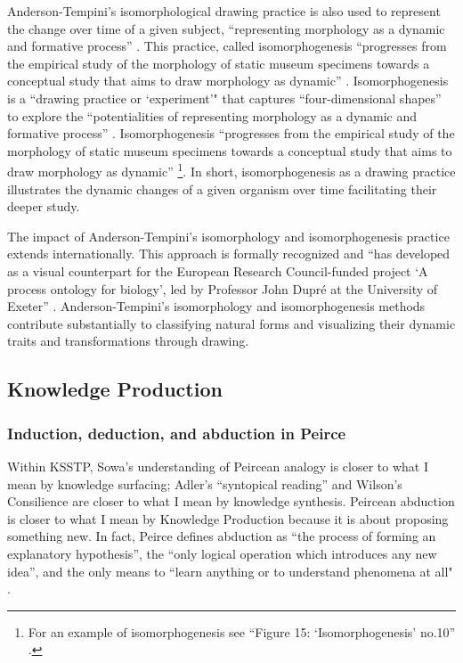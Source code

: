 Anderson-Tempini’s isomorphological drawing practice is also used to represent the change over time of a given subject, ``representing morphology as a dynamic and formative process” \citep[p. 179]{anderson_drawing_2018}. This practice, called isomorphogenesis ``progresses from the empirical study of the morphology of static museum specimens towards a conceptual study that aims to draw morphology as dynamic” \citep[p. 179]{anderson_drawing_2018}. Isomorphogenesis is a ``drawing practice or `experiment'" \citep[p. 179]{anderson_drawing_2018} that captures ``four-dimensional shapes” \citep[back cover]{anderson_drawing_2018} to explore the ``potentialities of representing morphology as a dynamic and formative process”  \citep[p. 179]{anderson_drawing_2018}. Isomorphogenesis ``progresses from the empirical study of the morphology of static museum specimens towards a conceptual study that aims to draw morphology as dynamic” \citep[p. 179]{anderson_drawing_2018} \footnote{For an example of isomorphogenesis see ``Figure 15: `Isomorphogenesis’ no.10” \citep[p. 203]{anderson_drawing_2018}.}. In short, isomorphogenesis as a drawing practice illustrates the dynamic changes of a given organism over time facilitating their deeper study.

The impact of Anderson-Tempini’s isomorphology and isomorphogenesis practice extends internationally. This approach is formally recognized and ``has developed as a visual counterpart for the European Research Council-funded project `A process ontology for biology’, led by Professor John Dupré at the University of Exeter” \citep[p. 179]{anderson_drawing_2018}. Anderson-Tempini’s isomorphology and isomorphogenesis methods contribute substantially to classifying natural forms and visualizing their dynamic traits and transformations through drawing.

\subsection{Knowledge Production}
\subsubsection{Induction, deduction, and abduction in Peirce}
\noindent Within KSSTP, Sowa’s understanding of Peircean analogy is closer to what I mean by knowledge surfacing; Adler’s ``syntopical reading” and Wilson’s Consilience are closer to what I mean by knowledge synthesis. Peircean abduction is closer to what I mean by Knowledge Production because it is about proposing something new. In fact, Peirce defines abduction as ``the process of forming an explanatory hypothesis”, the “only logical operation which introduces any new idea”, and the only means to ``learn anything or to understand phenomena at all"  \citep[p. 106]{peirce_pragmatism_1960}. 

